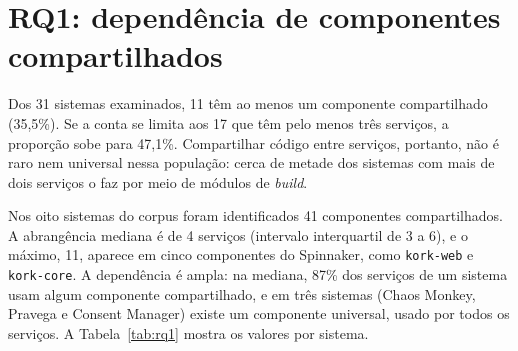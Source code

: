 \begin{table}[htbp]
\centering
{}
\end{table}

\section{RQ1: dependência de componentes compartilhados}
\label{sec:res-rq1}

Dos 31 sistemas examinados, 11 têm ao menos um componente compartilhado (35,5\%). Se a conta se limita aos 17 que têm pelo menos três serviços, a proporção sobe para 47,1\%. Compartilhar código entre serviços, portanto, não é raro nem universal nessa população: cerca de metade dos sistemas com mais de dois serviços o faz por meio de módulos de \textit{build}.

Nos oito sistemas do corpus foram identificados 41 componentes compartilhados. A abrangência mediana é de 4 serviços (intervalo interquartil de 3 a 6), e o máximo, 11, aparece em cinco componentes do Spinnaker, como \texttt{kork-web} e \texttt{kork-core}. A dependência é ampla: na mediana, 87\% dos serviços de um sistema usam algum componente compartilhado, e em três sistemas (Chaos Monkey, Pravega e Consent Manager) existe um componente universal, usado por todos os serviços. A Tabela~\ref{tab:rq1} mostra os valores por sistema.

